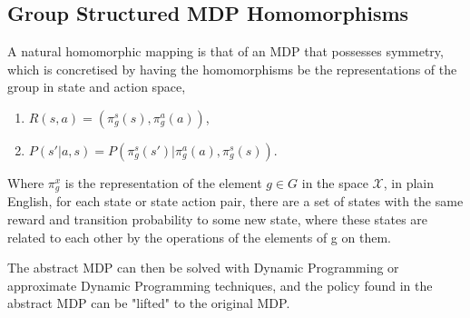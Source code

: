 \subsection{Group Structured MDP Homomorphisms}
A natural homomorphic mapping is that of an MDP that possesses symmetry, which is concretised by having the homomorphisms be the representations of the group in state and action space,
\begin{enumerate}
	\item $R(s, a) = (\pi^s_g(s), \pi_g^a(a))$,
	\item $P(s'| a, s) =P(\pi_g^s(s')| \pi_g^a(a), \pi_g^s(s))$.
\end{enumerate}
Where $\pi_g^x$ is the representation of the element $g \in G$ in the space $\mathcal{X}$, in plain English, for each state or state action pair, there are a set of states with the same reward and transition probability to some new state, where these states are related to each other by the operations of the elements of g on them.



The abstract MDP can then be solved with Dynamic Programming or approximate Dynamic Programming techniques, and the policy found in the abstract MDP can be "lifted" to the original MDP.



